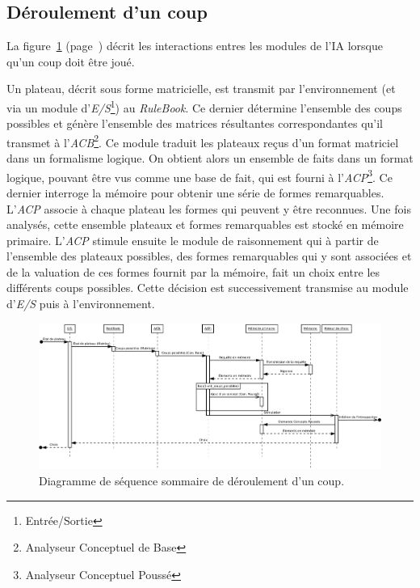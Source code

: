 \subsection{Déroulement d'un coup}

La figure~\ref{diag_sequence_coup} (page~\pageref{diag_sequence_coup}) décrit les interactions entres les modules de l'IA lorsque qu'un coup doit être joué.

Un plateau, décrit sous forme matricielle, est transmit par l'environnement (et via un module d'\emph{E/S}\footnote{Entrée/Sortie}) au \emph{RuleBook}. Ce dernier détermine l'ensemble des coups possibles et génère l'ensemble des matrices résultantes correspondantes qu'il transmet à l'\emph{ACB}\footnote{Analyseur Conceptuel de Base}. Ce module traduit les plateaux reçus d'un format matriciel dans un formalisme logique. On obtient alors un ensemble de faits dans un format logique, pouvant être vus comme une base de fait, qui est fourni à l'\emph{ACP}\footnote{Analyseur Conceptuel Poussé}. Ce dernier interroge la mémoire pour obtenir une série de formes remarquables. L'\emph{ACP} associe à chaque plateau les formes qui peuvent y être reconnues. Une fois analysés, cette ensemble plateaux et formes remarquables est stocké en mémoire primaire. L'\emph{ACP} stimule ensuite le module de raisonnement qui à partir de l'ensemble des plateaux possibles, des formes remarquables qui y sont associées et de la valuation de ces formes fournit par la mémoire, fait un choix entre les différents coups possibles. Cette décision est successivement transmise au module d'\emph{E/S} puis à l'environnement.

\begin{figure}[p]
\centering
\includegraphics[width=0.9\textheight,angle=90]{files/analyse/sequence}
\caption{Diagramme de séquence sommaire de déroulement d'un coup.}
\label{diag_sequence_coup}
\end{figure}
